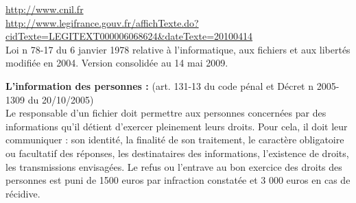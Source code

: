 \documentclass[a4paper,11pt]{article}				    %
\begin{document}
{
\url{http://www.cnil.fr}\\
\url{http://www.legifrance.gouv.fr/affichTexte.do?cidTexte=LEGITEXT000006068624&dateTexte=20100414}
}
{
\\Loi n 78-17 du 6 janvier 1978 relative \`a l'informatique, aux fichiers et aux libert\'es modifi\'ee en 2004. 
Version consolid\'ee au 14 mai 2009.
}
{
\normalsize\textbf{L'information des personnes :} (art. 131-13 du code p\'enal et D\'ecret n 2005-1309 du 20/10/2005)\\
Le responsable d'un fichier doit permettre aux personnes concern\'ees par des informations qu'il d\'etient d'exercer pleinement leurs droits. Pour cela, il doit leur communiquer : son identit\'e, la finalit\'e de son traitement, le caract\`ere obligatoire ou facultatif des r\'eponses, les destinataires des informations, l'existence de droits, les transmissions envisag\'ees. 
Le refus ou l'entrave au bon exercice des droits des personnes est puni de 1500 euros par infraction constat\'ee et 3 000 euros en cas de r\'ecidive.

}
\end{document}
